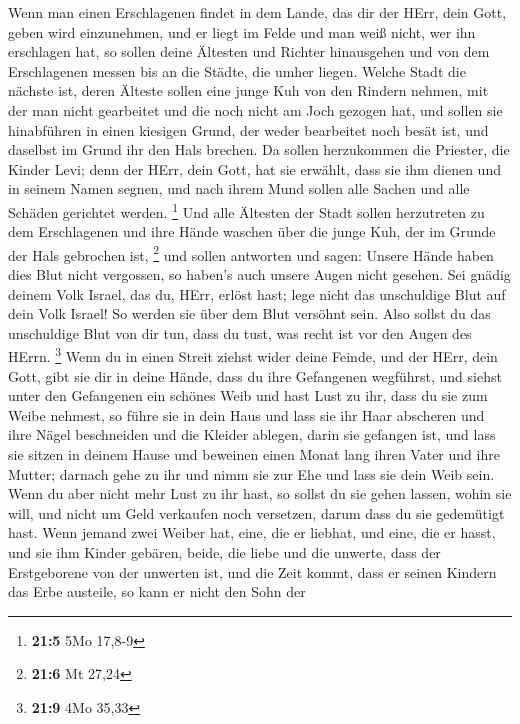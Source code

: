  Wenn man einen Erschlagenen findet in dem Lande, das dir
der HErr, dein Gott, geben wird einzunehmen, und er liegt im Felde und
man weiß nicht, wer ihn erschlagen hat,  so sollen deine
Ältesten und Richter hinausgehen und von dem Erschlagenen messen bis an
die Städte, die umher liegen.  Welche Stadt die nächste
ist, deren Älteste sollen eine junge Kuh von den Rindern nehmen, mit der
man nicht gearbeitet und die noch nicht am Joch gezogen hat,
 und sollen sie hinabführen in einen kiesigen Grund, der
weder bearbeitet noch besät ist, und daselbst im Grund ihr den Hals
brechen.  Da sollen herzukommen die Priester, die Kinder
Levi; denn der HErr, dein Gott, hat sie erwählt, dass sie ihm dienen und
in seinem Namen segnen, und nach ihrem Mund sollen alle Sachen und alle
Schäden gerichtet werden. \footnote{\textbf{21:5} 5Mo 17,8-9}
 Und alle Ältesten der Stadt sollen herzutreten zu dem
Erschlagenen und ihre Hände waschen über die junge Kuh, der im Grunde
der Hals gebrochen ist, \footnote{\textbf{21:6} Mt 27,24} 
und sollen antworten und sagen: Unsere Hände haben dies Blut nicht
vergossen, so haben's auch unsere Augen nicht gesehen. 
Sei gnädig deinem Volk Israel, das du, HErr, erlöst hast; lege nicht das
unschuldige Blut auf dein Volk Israel! So werden sie über dem Blut
versöhnt sein.  Also sollst du das unschuldige Blut von
dir tun, dass du tust, was recht ist vor den Augen des HErrn.
\footnote{\textbf{21:9} 4Mo 35,33}  Wenn du in einen
Streit ziehst wider deine Feinde, und der HErr, dein Gott, gibt sie dir
in deine Hände, dass du ihre Gefangenen wegführst,  und
siehst unter den Gefangenen ein schönes Weib und hast Lust zu ihr, dass
du sie zum Weibe nehmest,  so führe sie in dein Haus und
lass sie ihr Haar abscheren und ihre Nägel beschneiden 
und die Kleider ablegen, darin sie gefangen ist, und lass sie sitzen in
deinem Hause und beweinen einen Monat lang ihren Vater und ihre Mutter;
darnach gehe zu ihr und nimm sie zur Ehe und lass sie dein Weib sein.
 Wenn du aber nicht mehr Lust zu ihr hast, so sollst du
sie gehen lassen, wohin sie will, und nicht um Geld verkaufen noch
versetzen, darum dass du sie gedemütigt hast.  Wenn
jemand zwei Weiber hat, eine, die er liebhat, und eine, die er hasst,
und sie ihm Kinder gebären, beide, die liebe und die unwerte, dass der
Erstgeborene von der unwerten ist,  und die Zeit kommt,
dass er seinen Kindern das Erbe austeile, so kann er nicht den Sohn der
